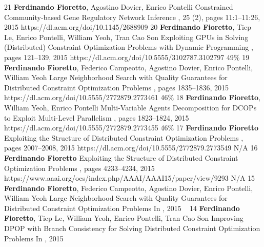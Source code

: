 \begin{pubs}
\journalentry 
	{21}	%
	{{\bf Ferdinando Fioretto}, Agostino Dovier, Enrico Pontelli}
	{Constrained Community-based Gene Regulatory Network Inference}
	{, 25 (2), pages 11:1--11:26, 2015}
	{https://dl.acm.org/doi/10.1145/2688909}
\confentry
	{20} %
	{{\bf Ferdinando Fioretto}, Tiep Le, Enrico Pontelli, William Yeoh, Tran Cao Son}
	{Exploiting GPUs in Solving (Distributed) Constraint Optimization Problems with Dynamic Programming}
	{\procCP, pages 121--139, 2015}
	{https://dl.acm.org/doi/10.5555/3102787.3102797}
	{49\%}%
\confentry
	{19} %
	{{\bf Ferdinando Fioretto}, Federico Campeotto, Agostino Dovier, Enrico Pontelli, William Yeoh}
	{Large Neighborhood Search with Quality Guarantees for Distributed Constraint Optimization Problems}
	{\procAAMAS, pages 1835--1836, 2015}
	{https://dl.acm.org/doi/10.5555/2772879.2773461}
	{46\%}
\confentry
	{18} %
	{{\bf Ferdinando Fioretto}, William Yeoh, Enrico Pontelli}
	{Multi-Variable Agents Decomposition for DCOPs to Exploit Multi-Level Parallelism}
	{\procAAMAS, pages 1823--1824, 2015}
	{https://dl.acm.org/doi/10.5555/2772879.2773455}
	{46\%}
\confentry
	{17} %
	{{\bf Ferdinando Fioretto}}
	{Exploiting the Structure of Distributed Constraint Optimization Problems} 
	{\procAAMAS, pages 2007--2008, 2015}
	{https://dl.acm.org/doi/10.5555/2772879.2773549}
	{N/A}
\confentry
	{16} %
	{{\bf Ferdinando Fioretto}} 
	{Exploiting the Structure of Distributed Constraint Optimization Problems}
	{\procAAAI,  pages 4233--4234, 2015}
	{https://www.aaai.org/ocs/index.php/AAAI/AAAI15/paper/view/9293}
	{N/A}
\wsentry
	{15} %
	{{\bf Ferdinando Fioretto}, Federico Campeotto, Agostino Dovier, Enrico Pontelli, William Yeoh}
	{Large Neighborhood Search with Quality Guarantees for Distributed Constraint Optimization Problems} 
	{In , 2015}
	{~}
\wsentry 
	{14} %
	{{\bf Ferdinando Fioretto}, Tiep Le, William Yeoh, Enrico Pontelli, Tran Cao Son}
	{Improving DPOP with Branch Consistency for Solving Distributed Constraint Optimization Problems}
	{In , 2015}
	{~}


\end{pubs}
